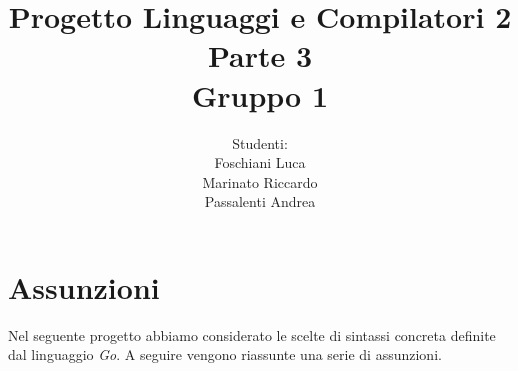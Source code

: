 \documentclass[12pt]{article}
\begin{document}
\title{\noindent \Huge Progetto Linguaggi e Compilatori 2\\ Parte 3 \\ Gruppo 1}
\date{}
\author{Studenti: \\Foschiani Luca\\ Marinato Riccardo \\Passalenti Andrea}

\maketitle
\newpage

\section{Assunzioni}
Nel seguente progetto abbiamo considerato le scelte di sintassi concreta definite dal linguaggio \textit{Go}.
A seguire vengono riassunte una serie di assunzioni.
\end{document}
